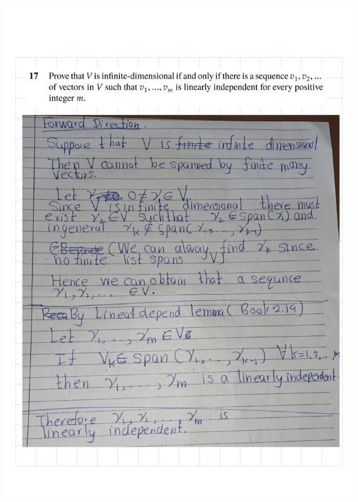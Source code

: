 \documentclass[
]{book}
\theoremstyle{definition}
\theoremstyle{definition}
\theoremstyle{definition}
\theoremstyle{definition}
\theoremstyle{remark}
\begin{document}
\includegraphics{fig/Ex2A/Ex2A-21.png}
\end{document}
